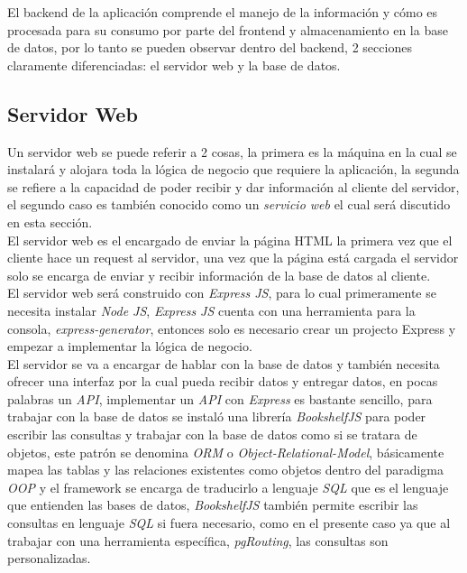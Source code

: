 El backend de la aplicación comprende el manejo de la información y cómo es procesada para su consumo por parte del frontend y almacenamiento en la base de datos, por lo tanto se pueden observar dentro del backend, 2 secciones claramente diferenciadas: el servidor web y la base de datos.\\




\subsection{Servidor Web}
\label{sub:servidor_web}

Un servidor web se puede referir a 2 cosas, la primera es la máquina en la cual se instalará y alojara toda la lógica de negocio que requiere la aplicación, la segunda se refiere a la capacidad de poder recibir y dar información al cliente del servidor, el segundo caso es también conocido como un \emph{servicio web} el cual será discutido en esta sección.\\

El servidor web es el encargado de enviar la página HTML la primera vez que el cliente hace un request al servidor, una vez que la página está cargada el servidor solo se encarga de enviar y recibir información de la base de datos al cliente.\\

El servidor web será construido con \emph{Express JS}, para lo cual primeramente se necesita instalar \emph{Node JS}, \emph{Express JS} cuenta con una herramienta para la consola, \emph{express-generator}, entonces solo es necesario crear un projecto Express y empezar a implementar la lógica de negocio.\\

El servidor se va a encargar de hablar con la base de datos y también necesita ofrecer una interfaz por la cual pueda recibir datos y entregar datos, en pocas palabras un \emph{API}, implementar un \emph{API} con \emph{Express} es bastante sencillo, para trabajar con la base de datos se instaló una librería \emph{BookshelfJS} para poder escribir las consultas y trabajar con la base de datos como si se tratara de objetos, este patrón se denomina \emph{ORM} o \emph{Object-Relational-Model}, básicamente mapea las tablas y las relaciones existentes como objetos dentro del paradigma \emph{OOP} y el framework se encarga de traducirlo a lenguaje \emph{SQL} que es el lenguaje que entienden las bases de datos, \emph{BookshelfJS} también permite escribir las consultas en lenguaje \emph{SQL} si fuera necesario, como en el presente caso ya que al  trabajar con una herramienta específica, \emph{pgRouting}, las consultas son personalizadas.\\

